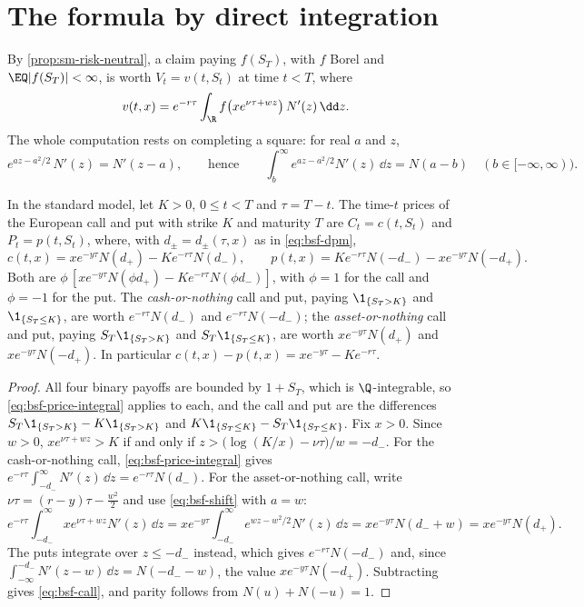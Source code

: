 \section{The formula by direct integration}\label{sec:bsf-integration}

By \cref{prop:sm-risk-neutral}, a claim paying $f(S_T)$, with $f$ Borel and $\EQ|f(S_T)|<\infty$, is
worth $V_t=v(t,S_t)$ at time $t<T$, where
\begin{equation}\label{eq:bsf-price-integral}
  v(t,x)=e^{-r\tau}\int_\R f\big(xe^{\nu\tau+wz}\big)\,N'(z)\,\dd z .
\end{equation}
The whole computation rests on completing a square: for real $a$ and $z$,
\begin{equation}\label{eq:bsf-shift}
  e^{az-a^2/2}\,N'(z)=N'(z-a),\qquad\text{hence}\qquad
  \int_b^\infty e^{az-a^2/2}N'(z)\,\dd z=N(a-b)\quad(b\in[-\infty,\infty)) .
\end{equation}

\begin{theorem}\label{thm:bsf-formula}
In the standard model, let $K>0$, $0\le t<T$ and $\tau=T-t$. The time-$t$ prices of the European
call and put with strike $K$ and maturity $T$ are $C_t=c(t,S_t)$ and $P_t=p(t,S_t)$, where, with
$d_\pm=d_\pm(\tau,x)$ as in \eqref{eq:bsf-dpm},
\begin{equation}\label{eq:bsf-call}
  c(t,x)=xe^{-y\tau}N(d_+)-Ke^{-r\tau}N(d_-),\qquad
  p(t,x)=Ke^{-r\tau}N(-d_-)-xe^{-y\tau}N(-d_+) .
\end{equation}
Both are $\phi\,[xe^{-y\tau}N(\phi d_+)-Ke^{-r\tau}N(\phi d_-)]$, with $\phi=1$ for the call and
$\phi=-1$ for the put. The \emph{cash-or-nothing} call and put, paying $\1_{\{S_T>K\}}$ and
$\1_{\{S_T\le K\}}$, are worth $e^{-r\tau}N(d_-)$ and $e^{-r\tau}N(-d_-)$; the \emph{asset-or-nothing}
call and put, paying $S_T\1_{\{S_T>K\}}$ and $S_T\1_{\{S_T\le K\}}$, are worth $xe^{-y\tau}N(d_+)$ and
$xe^{-y\tau}N(-d_+)$. In particular $c(t,x)-p(t,x)=xe^{-y\tau}-Ke^{-r\tau}$.
\end{theorem}

\begin{proof}
All four binary payoffs are bounded by $1+S_T$, which is $\Q$-integrable, so
\eqref{eq:bsf-price-integral} applies to each, and the call and put are the differences
$S_T\1_{\{S_T>K\}}-K\1_{\{S_T>K\}}$ and $K\1_{\{S_T\le K\}}-S_T\1_{\{S_T\le K\}}$. Fix $x>0$. Since
$w>0$, $xe^{\nu\tau+wz}>K$ if and only if $z>\big(\log(K/x)-\nu\tau\big)/w=-d_-$. For the
cash-or-nothing call, \eqref{eq:bsf-price-integral} gives
$e^{-r\tau}\int_{-d_-}^\infty N'(z)\,\dd z=e^{-r\tau}N(d_-)$. For the asset-or-nothing call, write
$\nu\tau=(r-y)\tau-\frac{w^2}{2}$ and use \eqref{eq:bsf-shift} with $a=w$:
\[
  e^{-r\tau}\int_{-d_-}^\infty xe^{\nu\tau+wz}N'(z)\,\dd z
  =xe^{-y\tau}\int_{-d_-}^\infty e^{wz-w^2/2}N'(z)\,\dd z=xe^{-y\tau}N(d_-+w)=xe^{-y\tau}N(d_+) .
\]
The puts integrate over $z\le-d_-$ instead, which gives $e^{-r\tau}N(-d_-)$ and, since
$\int_{-\infty}^{-d_-}N'(z-w)\,\dd z=N(-d_--w)$, the value $xe^{-y\tau}N(-d_+)$. Subtracting gives
\eqref{eq:bsf-call}, and parity follows from $N(u)+N(-u)=1$.
\end{proof}

